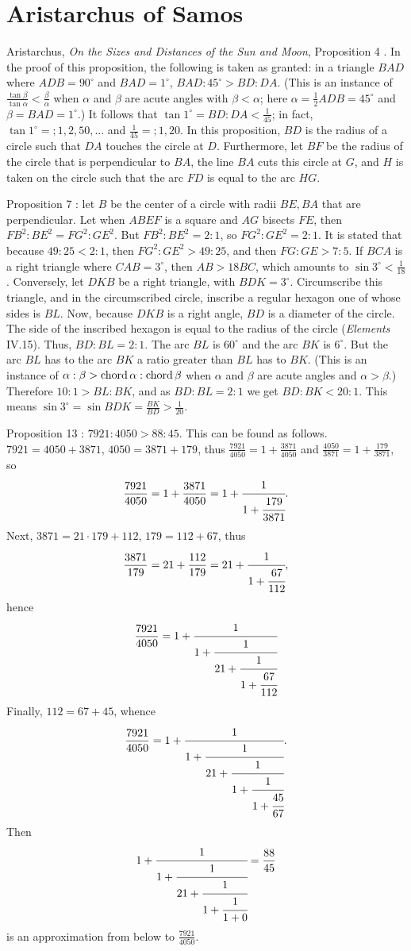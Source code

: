 \documentclass{article}
\newcommand{\chord}{\ensuremath\mathrm{chord}\,}
\theoremstyle{definition}
\begin{document}
\section{Aristarchus of Samos}
Aristarchus, {\em On the Sizes and Distances of the Sun and Moon}, Proposition 4 \cite[p.~367]{aristarchus}.
In the proof of this proposition, the following is taken as granted: in a triangle $BAD$ 
where $ADB=90^\circ$ and $BAD=1^\circ$, 
$BAD:45^\circ > BD:DA$. (This is an instance of
$\frac{\tan \beta}{\tan \alpha} < \frac{\beta}{\alpha}$ when $\alpha$ and $\beta$ are acute angles with $\beta<\alpha$; here
$\alpha=\frac{1}{2}ADB=45^\circ$ and $\beta = BAD=1^\circ$.)
It follows that $\tan 1^\circ = BD:DA < \frac{1}{45}$; in fact,
$\tan 1^\circ = ;1,2,50,\ldots$ and $\frac{1}{45}  = ; 1,20$. 
In this proposition, $BD$ is the radius of a circle such that $DA$ touches the circle at $D$. Furthermore, let $BF$ be the radius of the circle
that is perpendicular to $BA$, the line $BA$ cuts this circle at $G$, and $H$ is taken on the circle such that the arc $FD$ is equal
to the arc $HG$. 



Proposition 7 \cite[p.~379]{aristarchus}: let $B$ be the center of a circle with radii $BE,BA$ that are perpendicular. Let 
when $ABEF$ is a square and $AG$ bisects $FE$,
then $FB^2:BE^2 = FG^2:GE^2$.  
But $FB^2:BE^2 = 2:1$, so $FG^2:GE^2 = 2:1$. It is stated that because
$49:25<2:1$, then $FG^2:GE^2 > 49:25$, and then $FG:GE > 7:5$. 
If $BCA$ is a right triangle where $CAB = 3^\circ$, then $AB > 18 BC$, which amounts to
$\sin 3^\circ < \frac{1}{18}$. 
Conversely, let $DKB$ be a right triangle, with $BDK=3^\circ$. Circumscribe this triangle, and in the circumscribed circle, inscribe a
regular hexagon one of whose sides is $BL$. Now, because $DKB$ is a right angle, $BD$ is  a diameter of the circle.
The side of the inscribed hexagon is equal to the radius of the circle ({\em Elements} IV.15). Thus, 
$BD:BL=2:1$. The arc $BL$ is $60^\circ$ and the arc $BK$ is $6^\circ$. But the arc $BL$ has to the arc $BK$ a ratio greater than $BL$ has to $BK$. (This is an instance of
$\alpha:\beta>\chord \alpha:\chord \beta$ when $\alpha$ and $\beta$ are acute angles and $\alpha>\beta$.)
Therefore $10:1 > BL:BK$, and as $BD:BL=2:1$ we get
$BD:BK < 20:1$. This means $\sin 3^\circ = \sin BDK = \frac{BK}{BD} > \frac{1}{20}$. 


Proposition 13 \cite[p.~397]{aristarchus}: $7921:4050>88:45$. This can be found as follows.
$7921=4050+3871$, $4050=3871+179$, thus
$\frac{7921}{4050}=1+\frac{3871}{4050}$ and $\frac{4050}{3871}=1+\frac{179}{3871}$, so
\[
\frac{7921}{4050}=1+\frac{3871}{4050} = 1+\cfrac{1}{1+\cfrac{179}{3871}}.
\] 
Next, 
$3871=21\cdot 179+112$, $179=112+67$, thus
\[
\frac{3871}{179} = 21 +  \frac{112}{179} = 21+\cfrac{1}{1+\cfrac{67}{112}},
\]
hence
\[
\frac{7921}{4050} = 1+\cfrac{1}{1+\cfrac{1}{21+\cfrac{1}{1+\cfrac{67}{112}}}}
\]
Finally, $112=67+45$, whence
\[
\frac{7921}{4050} = 1+\cfrac{1}{1+\cfrac{1}{21+\cfrac{1}{1+\cfrac{1}{1+\cfrac{45}{67}}}}}.
\] 
Then
\[
1+\cfrac{1}{1+\cfrac{1}{21+\cfrac{1}{1+\cfrac{1}{1+0}}}} = \frac{88}{45}
\]
is an approximation from below to $\frac{7921}{4050}$. 
\end{document}

